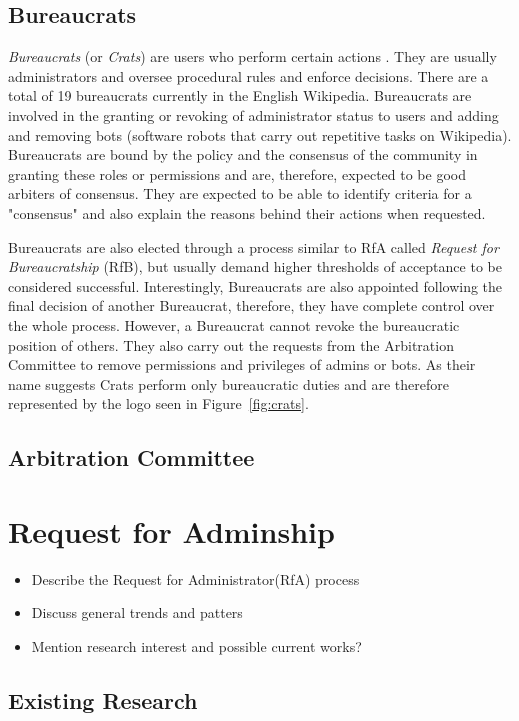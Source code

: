 \subsection{Bureaucrats}
\textit{Bureaucrats} (or \textit{Crats}) are users who perform certain actions \cite{wiki:bureaucrats}. They are usually administrators and oversee procedural rules and enforce decisions. There are a total of 19 bureaucrats currently in the English Wikipedia. Bureaucrats are involved in the granting or revoking of administrator status to users and adding and removing bots (software robots that carry out repetitive tasks on Wikipedia). Bureaucrats are bound by the policy and the consensus of the community in granting these roles or permissions and are, therefore, expected to be good arbiters of consensus. They are expected to be able to identify criteria for a "consensus" and also explain the reasons behind their actions when requested. 

Bureaucrats are also elected through a process similar to RfA called \textit{Request for Bureaucratship} (RfB), but usually demand higher thresholds of acceptance to be considered successful. Interestingly, Bureaucrats are also appointed following the final decision of another Bureaucrat, therefore, they have complete control over the whole process. However, a Bureaucrat cannot revoke the bureaucratic position of others. They also carry out the requests from the Arbitration Committee to remove permissions and privileges of admins or bots. As their name suggests Crats perform only bureaucratic duties and are therefore represented by the logo seen in Figure~\ref{fig:crats}.
\subsection{Arbitration Committee}



\section{Request for Adminship}
\begin{itemize}
    \item Describe the Request for Administrator(RfA) process
    \item Discuss general trends and patters
    \item Mention research interest and possible current works?
\end{itemize}

\subsection{Existing Research}